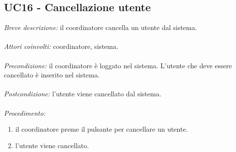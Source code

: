 \subsection{UC16 - Cancellazione utente}
\textit{Breve descrizione:} il coordinatore cancella un utente dal sistema. 
\\
\\
\textit{Attori coinvolti:} coordinatore, sistema.
\\
\\
\textit{Precondizione:} il coordinatore è loggato nel sistema.
L'utente che deve essere cancellato è inserito nel sistema.
\\
\\
\textit{Postcondizione:} l'utente viene cancellato dal sistema.
\\
\\
\textit{Procedimento:}
\begin{enumerate}
	\item il coordinatore preme il pulsante per cancellare un utente.
	\item l'utente viene cancellato.
\end{enumerate}

